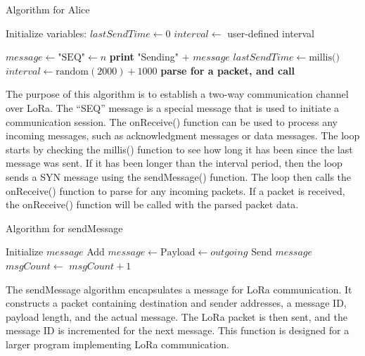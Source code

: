 \begin{algorithm}[hbt!]
  \caption{Algorithm for Alice}\label{alg:Alice}
  \begin{algorithmic}
  \State Initialize variables:
      \State $lastSendTime \gets 0$
      \State $interval \gets$ user-defined interval
      
              \State $message \gets \text{"SEQ"} \gets n$
              \State {}
              \State \textbf{print} "Sending" $+$ $message$
              \State $lastSendTime \gets \text{millis()}$
              \State $interval \gets \text{random}(2000) + 1000$ 
          \EndIf
          \State \textbf{parse for a packet, and call} 
      \EndFunction
  \end{algorithmic}
\end{algorithm}
The purpose of this algorithm is to establish a two-way communication channel over LoRa. The “SEQ” message is a special message that is used to initiate a communication session. The onReceive() function can be used to process any incoming messages, such as acknowledgment messages or data messages.
The loop starts by checking the millis() function to see how long it has been since the last message was sent. If it has been longer than the interval period, then the loop sends a SYN message using the sendMessage() function.
The loop then calls the onReceive() function to parse for any incoming packets. If a packet is received, the onReceive() function will be called with the parsed packet data.
\begin{algorithm}[hbt!]
  \caption{Algorithm for sendMessage}\label{alg:sendMessage}
  \begin{algorithmic}
          \State Initialize $message$
          \State Add $message \gets \text{Payload} \gets outgoing$
          \State Send $message$
          \State $msgCount \gets$ $msgCount + 1$
      \EndFunction
  \end{algorithmic}
  \end{algorithm}
The sendMessage algorithm encapsulates a message for LoRa communication. It constructs a packet containing destination and sender addresses, a message ID, payload length, and the actual message. The LoRa packet is then sent, and the message ID is incremented for the next message. This function is designed for a larger program implementing LoRa communication.
